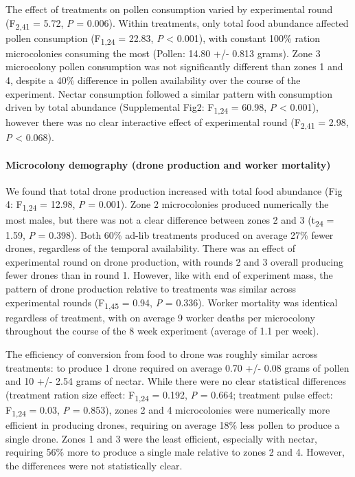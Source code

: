 \documentclass[11pt,]{article}
\let\oldparagraph\paragraph
\renewcommand{\paragraph}[1]{\oldparagraph{#1}\mbox{}}
\begin{document}
The effect of treatments on pollen consumption varied by experimental
round (F\textsubscript{2,41} = 5.72, \emph{P} = 0.006). Within
treatments, only total food abundance affected pollen consumption
(F\textsubscript{1,24} = 22.83, \emph{P} \textless{} 0.001), with
constant 100\% ration microcolonies consuming the most (Pollen: 14.80
+/- 0.813 grams). Zone 3 microcolony pollen consumption was not
significantly different than zones 1 and 4, despite a 40\% difference in
pollen availability over the course of the experiment. Nectar
consumption followed a similar pattern with consumption driven by total
abundance (Supplemental Fig2: F\textsubscript{1,24} = 60.98, \emph{P}
\textless{} 0.001), however there was no clear interactive effect of
experimental round (F\textsubscript{2,41} = 2.98, \emph{P} \textless{}
0.068).

\hypertarget{microcolony-demography-drone-production-and-worker-mortality}{%
\paragraph{Microcolony demography (drone production and worker
mortality)}\label{microcolony-demography-drone-production-and-worker-mortality}}

We found that total drone production increased with total food abundance
(Fig 4: F\textsubscript{1,24} = 12.98, \emph{P} = 0.001). Zone 2
microcolonies produced numerically the most males, but there was not a
clear difference between zones 2 and 3 (t\textsubscript{24} = 1.59,
\emph{P} = 0.398). Both 60\% ad-lib treatments produced on average 27\%
fewer drones, regardless of the temporal availability. There was an
effect of experimental round on drone production, with rounds 2 and 3
overall producing fewer drones than in round 1. However, like with end
of experiment mass, the pattern of drone production relative to
treatments was similar across experimental rounds (F\textsubscript{1,45}
= 0.94, \emph{P} = 0.336). Worker mortality was identical regardless of
treatment, with on average 9 worker deaths per microcolony throughout
the course of the 8 week experiment (average of 1.1 per week).

The efficiency of conversion from food to drone was roughly similar
across treatments: to produce 1 drone required on average 0.70 +/- 0.08
grams of pollen and 10 +/- 2.54 grams of nectar. While there were no
clear statistical differences (treatment ration size effect:
F\textsubscript{1,24} = 0.192, \emph{P} = 0.664; treatment pulse effect:
F\textsubscript{1,24} = 0.03, \emph{P} = 0.853), zones 2 and 4
microcolonies were numerically more efficient in producing drones,
requiring on average 18\% less pollen to produce a single drone. Zones 1
and 3 were the least efficient, especially with nectar, requiring 56\%
more to produce a single male relative to zones 2 and 4. However, the
differences were not statistically clear.
\end{document}
